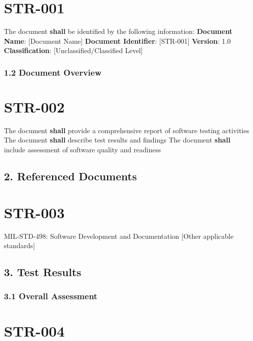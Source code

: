 \section{STR-001}\label{STR-001}

The document \textbf{shall} be identified by the following information:
\textbf{Document Name}: [Document Name]
\textbf{Document Identifier}: [STR-001]
\textbf{Version}: 1.0
\textbf{Classification}: [Unclassified/Classified Level]

\subsubsection{1.2 Document Overview}

\section{STR-002}\label{STR-002}

The document \textbf{shall} provide a comprehensive report of software testing activities
The document \textbf{shall} describe test results and findings
The document \textbf{shall} include assessment of software quality and readiness

\subsection{2. Referenced Documents}

\section{STR-003}\label{STR-003}

MIL-STD-498: Software Development and Documentation
[Other applicable standards]\\

\subsection{3. Test Results}

\subsubsection{3.1 Overall Assessment}

\section{STR-004}\label{STR-004}


